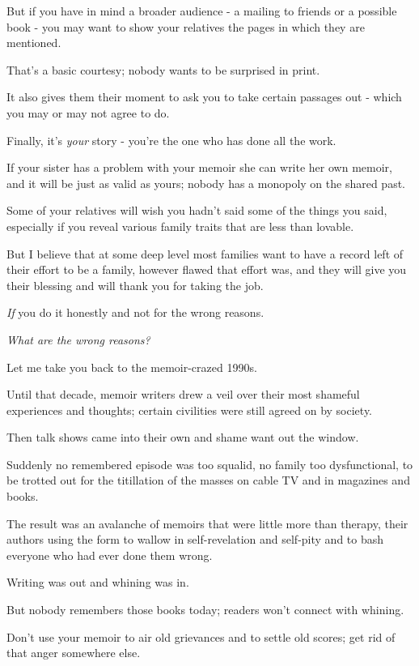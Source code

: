 \documentclass{book}
\numberwithin{equation}{section}
\begin{document}
But if you have in mind a broader audience - a mailing to friends or a possible book - you may want to show your relatives the pages in which they are mentioned.

That's a basic courtesy; nobody wants to be surprised in print.

It also gives them their moment to ask you to take certain passages out - which you may or may not agree to do.

%
Finally, it's \textit{your} story - you're the one who has done all the work.

If your sister has a problem with your memoir she can write her own memoir, and it will be just as valid as yours; nobody has a monopoly on the shared past.

Some of your relatives will wish you hadn't said some of the things you said, especially if you reveal various family traits that are less than lovable.

But I believe that at some deep level most families want to have a record left of their effort to be a family, however flawed that effort was, and they will give you their blessing and will thank you for taking the job.

\textit{If} you do it honestly and not for the wrong reasons.

%
\textit{What are the wrong reasons?}

Let me take you back to the memoir-crazed 1990s.

Until that decade, memoir writers drew a veil over their most shameful experiences and thoughts; certain civilities were still agreed on by society.

Then talk shows came into their own and shame want out the window.

Suddenly no remembered episode was too squalid, no family too dysfunctional, to be trotted out for the titillation of the masses on cable TV and in magazines and books.

The result was an avalanche of memoirs that were little more than therapy, their authors using the form to wallow in self-revelation and self-pity and to bash everyone who had ever done them wrong.

Writing was out and whining was in.

%
But nobody remembers those books today; readers won't connect with whining.

Don't use your memoir to air old grievances and to settle old scores; get rid of that anger somewhere else.
\end{document}

